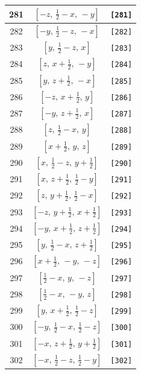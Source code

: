 \documentclass[fleqn,8pt]{jsarticle}
\begin{document}
\begin{longtable}{ccc}
281 & $\left[ - z,\, \frac{1}{2} - x,\, - y \right]$ & {\tt [281]} \\ \hline
282 & $\left[ - y,\, \frac{1}{2} - z,\, - x \right]$ & {\tt [282]} \\ \hline
283 & $\left[ y,\, \frac{1}{2} - z,\, x \right]$ & {\tt [283]} \\ \hline
284 & $\left[ z,\, x + \frac{1}{2},\, - y \right]$ & {\tt [284]} \\ \hline
285 & $\left[ y,\, z + \frac{1}{2},\, - x \right]$ & {\tt [285]} \\ \hline
286 & $\left[ - z,\, x + \frac{1}{2},\, y \right]$ & {\tt [286]} \\ \hline
287 & $\left[ - y,\, z + \frac{1}{2},\, x \right]$ & {\tt [287]} \\ \hline
288 & $\left[ z,\, \frac{1}{2} - x,\, y \right]$ & {\tt [288]} \\ \hline
289 & $\left[ x + \frac{1}{2},\, y,\, z \right]$ & {\tt [289]} \\ \hline
290 & $\left[ x,\, \frac{1}{2} - z,\, y + \frac{1}{2} \right]$ & {\tt [290]} \\ \hline
291 & $\left[ x,\, z + \frac{1}{2},\, \frac{1}{2} - y \right]$ & {\tt [291]} \\ \hline
292 & $\left[ z,\, y + \frac{1}{2},\, \frac{1}{2} - x \right]$ & {\tt [292]} \\ \hline
293 & $\left[ - z,\, y + \frac{1}{2},\, x + \frac{1}{2} \right]$ & {\tt [293]} \\ \hline
294 & $\left[ - y,\, x + \frac{1}{2},\, z + \frac{1}{2} \right]$ & {\tt [294]} \\ \hline
295 & $\left[ y,\, \frac{1}{2} - x,\, z + \frac{1}{2} \right]$ & {\tt [295]} \\ \hline
296 & $\left[ x + \frac{1}{2},\, - y,\, - z \right]$ & {\tt [296]} \\ \hline
297 & $\left[ \frac{1}{2} - x,\, y,\, - z \right]$ & {\tt [297]} \\ \hline
298 & $\left[ \frac{1}{2} - x,\, - y,\, z \right]$ & {\tt [298]} \\ \hline
299 & $\left[ y,\, x + \frac{1}{2},\, \frac{1}{2} - z \right]$ & {\tt [299]} \\ \hline
300 & $\left[ - y,\, \frac{1}{2} - x,\, \frac{1}{2} - z \right]$ & {\tt [300]} \\ \hline
301 & $\left[ - x,\, z + \frac{1}{2},\, y + \frac{1}{2} \right]$ & {\tt [301]} \\ \hline
302 & $\left[ - x,\, \frac{1}{2} - z,\, \frac{1}{2} - y \right]$ & {\tt [302]} \\ \hline

\end{longtable}
\end{document}
